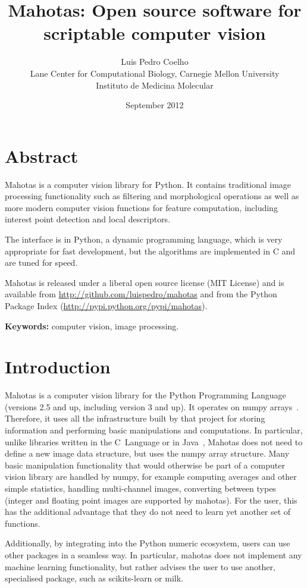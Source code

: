 \documentclass{scrartcl}
\title{Mahotas: Open source software for scriptable computer vision}
\author{Luis Pedro Coelho\\
Lane Center for Computational Biology, Carnegie Mellon University\\
Instituto de Medicina Molecular}
\date{September 2012}
\newcommand*{\cpp}{{C\nolinebreak[4]\hspace{-.05em}\raisebox{.4ex}{\tiny\textbf{++}}}}
\begin{document}
\maketitle

\section*{Abstract}
Mahotas is a computer vision library for Python. It contains traditional image
processing functionality such as filtering and morphological operations as well
as more modern computer vision functions for feature computation, including
interest point detection and local descriptors.

The interface is in Python, a dynamic programming language, which is very
appropriate for fast development, but the algorithms are implemented in \cpp{}
and are tuned for speed.

Mahotas is released under a liberal open source license (MIT License) and is
available from \url{http://github.com/luispedro/mahotas} and from the Python Package
Index (\url{http://pypi.python.org/pypi/mahotas}).

\textbf{Keywords:} computer vision, image processing.

\section{Introduction}

Mahotas is a computer vision library for the Python Programming Language
(versions 2.5 and up, including version 3 and up). It operates on numpy
arrays~\citep{numpystructure}. Therefore, it uses all the infrastructure built
by that project for storing information and performing basic manipulations and
computations. In particular, unlike libraries written in the C~Language or in
Java~\citep{Marcel:2010:TMP:1873951.1874254}, Mahotas does not need to define a
new image data structure, but uses the numpy array structure. Many basic
manipulation functionality that would otherwise be part of a computer vision
library are handled by numpy, for example computing averages and other simple
statistics, handling multi-channel images, converting between types (integer
and floating point images are supported by mahotas). For the user, this has the
additional advantage that they do not need to learn yet another set of
functions.

Additionally, by integrating into the Python numeric ecosystem, users can use
other packages in a seamless way. In particular, mahotas does not implement any
machine learning functionality, but rather advises the user to use another,
specialised package, such as scikits-learn or milk.
\end{document}
